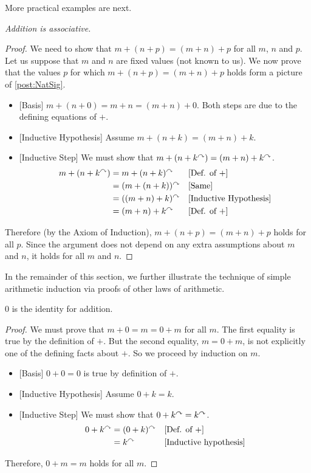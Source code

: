 More practical examples are next.

\begin{prop}

  \emph{Addition is associative.}

\begin{proof}
  We need to show that $m + (n+p) = (m+n)+p$ for all $m$, $n$ and $p$.
  Let us suppose that $m$ and $n$ are fixed values (not known to us).
  We now prove that the values $p$ for which $m+(n+p) = (m+n)+p$ holds
  form a picture of \ref{post:NatSig}.
  \begin{itemize}
  \item{}[Basis] $m+(n+0) = m+n = (m+n)+0$. Both steps are due to the
    defining equations of $+$.
  \item{}[Inductive Hypothesis] Assume $m+(n+k) = (m+n)+k$.
  \item{}[Inductive Step] We must show that $m+(n+k^\curvearrowright) =
    (m+n)+k^\curvearrowright$. 
    \begin{align*}
      m+(n+k^\curvearrowright) &= m + (n+k)^\curvearrowright &&\text{[Def. of +]}\\
      &= (m+(n+k))^\curvearrowright&&\text{[Same]}\\
      &= ((m+n)+k)^\curvearrowright&&\text{[Inductive Hypothesis]}\\
      &= (m+n)+k^\curvearrowright &&\text{[Def. of $+$]}
    \end{align*}
  \end{itemize}
  Therefore (by the Axiom of Induction), $m+(n+p) = (m+n)+p$ holds for
  all $p$. Since the argument does not depend on any extra assumptions
  about $m$ and $n$, it holds for all $m$ and $n$.
\end{proof}
\end{prop}

\printbreak

In the remainder of this section, we further illustrate the technique of simple arithmetic induction via proofs of other laws of arithmetic.

\ipadbreak

\begin{prop}\label{prop:AddZero}
  $0$ is the identity for addition.

\begin{proof}
  We must prove that $m+0 = m = 0 + m$ for all $m$. The first equality is true by the definition of $+$.
  But the second equality, $m = 0 + m$, is not explicitly one of the defining facts about $+$. So we proceed by induction on $m$.
  \begin{itemize}
  \item{}[Basis] $0+0 = 0$ is true by definition of $+$.
  \item{}[Inductive Hypothesis] Assume $0 + k = k$.
  \item{}[Inductive Step] We must show that $0 + k^\curvearrowright = k^\curvearrowright$.
    \begin{align*}
      0 + k^\curvearrowright &= (0+k)^\curvearrowright &&\text{[Def. of $+$]}\\
      &= k^\curvearrowright &&\text{[Inductive hypothesis]}
    \end{align*}
  \end{itemize}
  Therefore, $0+m=m$ holds for all $m$.
\end{proof}
\end{prop}

